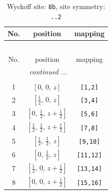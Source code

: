 \documentclass[fleqn,8pt]{jsarticle}
\begin{document}
\begin{longtable}{ccc}
\caption{Wyckoff site: {\tt 8b}, site symmetry: {\tt ..2}}
 \\
 \hline \hline
No. & position & mapping \\ \hline \endfirsthead

\multicolumn{2}{l}{\tablename\ \thetable{}} \\
 \hline \hline
No. & position & mapping \\ \hline \endhead

 \hline \hline
\multicolumn{2}{r}{\footnotesize\it continued ...} \\ \endfoot

 \hline \hline
\multicolumn{2}{r}{} \\ \endlastfoot

1 & $\left[ 0,\, 0,\, z \right]$ & {\tt [1,2]} \\ \hline
2 & $\left[ \frac{1}{2},\, 0,\, z \right]$ & {\tt [3,4]} \\ \hline
3 & $\left[ 0,\, \frac{1}{2},\, z + \frac{1}{2} \right]$ & {\tt [5,6]} \\ \hline
4 & $\left[ \frac{1}{2},\, \frac{1}{2},\, z + \frac{1}{2} \right]$ & {\tt [7,8]} \\ \hline
5 & $\left[ \frac{1}{2},\, \frac{1}{2},\, z \right]$ & {\tt [9,10]} \\ \hline
6 & $\left[ 0,\, \frac{1}{2},\, z \right]$ & {\tt [11,12]} \\ \hline
7 & $\left[ \frac{1}{2},\, 0,\, z + \frac{1}{2} \right]$ & {\tt [13,14]} \\ \hline
8 & $\left[ 0,\, 0,\, z + \frac{1}{2} \right]$ & {\tt [15,16]} \\
\end{longtable}
\renewcommand{\arraystretch}{1.2}
\end{document}
